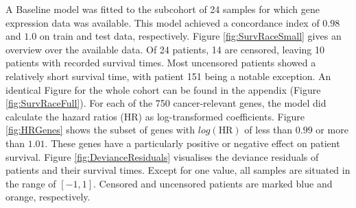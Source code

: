 A Baseline model was fitted to the subcohort of 24 samples for which gene expression data was available. This model achieved a concordance index of $0.98$ and $1.0$ on train and test data, respectively.
Figure \ref{fig:SurvRaceSmall} gives an overview over the available data. Of 24 patients, 14 are censored, leaving 10 patients with recorded survival times. Most uncensored patients showed a relatively short survival time, with patient 151 being a notable exception. An identical Figure for the whole cohort can be found in the appendix (Figure \ref{fig:SurvRaceFull}).
For each of the 750 cancer-relevant genes, the model did calculate the hazard ratios (HR) as log-transformed coefficients. Figure \ref{fig:HRGenes} shows the subset of genes with $log(\text{HR})$ of less than $0.99$ or more than $1.01$. These genes have a particularly positive or negative effect on patient survival.
Figure \ref{fig:DevianceResiduals} visualises the deviance residuals of patients and their survival times. Except for one value, all samples are situated in the range of $[-1,1]$. Censored and uncensored patients are marked blue and orange, respectively.

